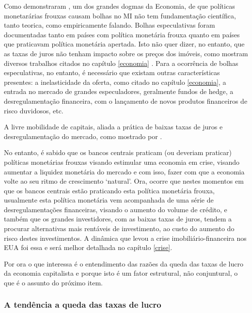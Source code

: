 \documentclass[
	12pt,				%
	oneside,			%
	a4paper,			%
	chapter=TITLE,		%
	section=TITLE,		%
	english,			%
	brazil				%
	]{abntex2}
\begin{document}
\begin{refsection}
Como demonstraram \textcite{joebges}, um dos grandes dogmas da Economia, de que políticas
monetarárias frouxas causam bolhas no \gls{MI} não tem fundamentação científica,
tanto teorica, como empiricamente falando. Bolhas especulativas foram
documentadas tanto em países com política monetária frouxa quanto em países que
praticavam política monetária apertada. Isto não quer dizer, no entanto, que as
taxas de juros não tenham impacto sobre os preços dos imóveis, como mostram
diversos trabalhos citados no capítulo \ref{economia} \autocite{macroHousing,goodhart2008,ADAMS2010}. Para a ocorrência de bolhas especulativas, no
entanto, é necessário que existam outras características presentes: a
inelasticidade da oferta, como citado no capítulo \ref{economia}, a entrada no
mercado de grandes especuladores, geralmente fundos de hedge, a
desregulamentação financeira, com o lançamento de novos produtos financeiros de
risco duvidosos, etc.

A livre mobilidade de capitais, aliada a prática de baixas taxas de juros e
desregulamentação do mercado, como mostrado por \autocite{estonia}.

No entanto, é sabido que os bancos centrais praticam (ou deveriam praticar)
políticas monetárias frouxas visando estimular uma economia em crise, visando
aumentar a liquidez monetária do mercado e com isso, fazer com que a economia
volte ao seu ritmo de crescimento `natural'. Ora, ocorre que nestes momentos em
que os bancos centrais estão praticando esta política monetária frouxa,
usualmente esta política monetária vem acompanhada de uma série de
desregulamentações financeiras, visando o aumento do volume de crédito, e também
que os grandes investidores, com as baixas taxas de juros, tendem a procurar
alternativas mais rentáveis de investimento, ao custo do aumento do risco destes
investimentos. A dinâmica que levou a crise imobiliário-financeira nos \gls{EUA}
foi essa e será melhor detalhada no capítulo \ref{crise}.

Por ora o que interessa é o entendimento das razões da queda das taxas de lucro
da economia capitalista e porque isto é um fator estrutural, não conjuntural, o
que é o assunto do próximo item.

\hypertarget{a-tenduxeancia-a-queda-das-taxas-de-lucro}{%
\subsubsection{A tendência a queda das taxas de lucro}\label{a-tenduxeancia-a-queda-das-taxas-de-lucro}}


\end{refsection}
\end{document}
